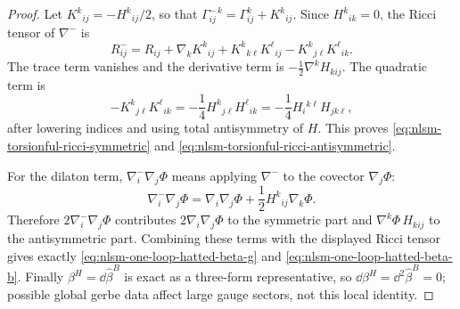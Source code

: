 \begin{proof}
Let \(K^k{}_{ij}=-H^k{}_{ij}/2\), so that
\(\Gamma^{-\,k}_{ij}=\Gamma^k_{ij}+K^k{}_{ij}\).  Since \(H^k{}_{ik}=0\),
the Ricci tensor of \(\nabla^-\) is
\begin{equation}
  R^-_{ij}
  =
  R_{ij}
  +\nabla_kK^k{}_{ij}
  +K^k{}_{k\ell}K^\ell{}_{ij}
  -K^k{}_{j\ell}K^\ell{}_{ik}.
  \label{eq:nlsm-ricci-with-contorsion}
\end{equation}
The trace term vanishes and the derivative term is
\(-\frac12\nabla^kH_{kij}\).  The quadratic term is
\[
  -K^k{}_{j\ell}K^\ell{}_{ik}
  =
  -\frac14H^k{}_{j\ell}H^\ell{}_{ik}
  =
  -\frac14H_i{}^{k\ell}H_{jk\ell},
\]
after lowering indices and using total antisymmetry of \(H\).  This proves
\eqref{eq:nlsm-torsionful-ricci-symmetric} and
\eqref{eq:nlsm-torsionful-ricci-antisymmetric}.

For the dilaton term, \(\nabla^-_i\nabla_j\Phi\) means applying
\(\nabla^-\) to the covector \(\nabla_j\Phi\):
\[
  \nabla^-_i\nabla_j\Phi
  =
  \nabla_i\nabla_j\Phi+\frac12H^k{}_{ij}\nabla_k\Phi .
\]
Therefore \(2\nabla^-_i\nabla_j\Phi\) contributes
\(2\nabla_i\nabla_j\Phi\) to the symmetric part and
\(\nabla^k\Phi\,H_{kij}\) to the antisymmetric part.  Combining these
terms with the displayed Ricci tensor gives exactly
\eqref{eq:nlsm-one-loop-hatted-beta-g} and
\eqref{eq:nlsm-one-loop-hatted-beta-b}.  Finally
\(\beta^H=\dd\widehat\beta^B\) is exact as a three-form representative, so
\(\dd\beta^H=\dd^2\widehat\beta^B=0\); possible global gerbe data affect
large gauge sectors, not this local identity.
\end{proof}

